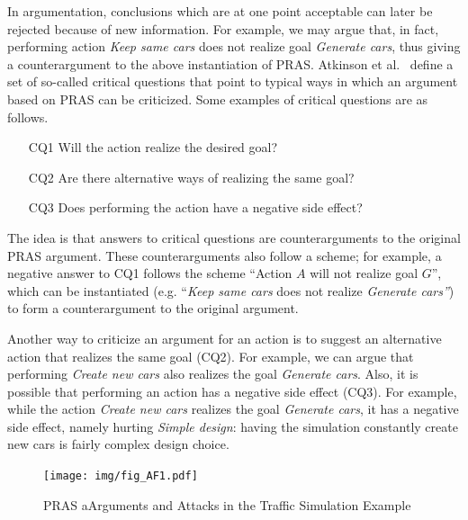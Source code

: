 In argumentation, conclusions which are at one point acceptable can later be rejected because of new information. For example, we may argue that, in fact, performing action \emph{Keep same cars} does not realize goal \emph{Generate cars}, thus giving a counterargument to the above instantiation of PRAS. Atkinson et al.~\cite{atkinson2007} define a set of so-called critical questions that point to typical ways in which an argument based on PRAS can be criticized. Some examples of critical questions are as follows.

\begin{enumerate}
\item[CQ1] Will the action realize the desired goal?
\item[CQ2] Are there alternative ways of realizing the same goal?
\item[CQ3] Does performing the action have a negative side effect?
\end{enumerate}

The idea is that answers to critical questions are counterarguments to the original PRAS argument. These counterarguments also follow a scheme; for example, a negative answer to CQ1 follows the scheme ``Action $A$ will not realize goal $G$'', which can be instantiated (e.g. ``\emph{Keep same cars} does not realize \emph{Generate cars''}) to form a counterargument to the original argument. 

Another way to criticize an argument for an action is to suggest an alternative action that realizes the same goal (CQ2). For example, we can argue that performing \emph{Create new cars} also realizes the goal \emph{Generate cars}. Also, it is possible that performing an action has a negative side effect (CQ3). For example, while the action \emph{Create new cars} realizes the goal \emph{Generate cars}, it has a negative side effect, namely hurting \emph{Simple design}: having the simulation constantly create new cars is fairly complex design choice. 

\begin{figure}[t]
\centering
\texttt{[image: img/fig\_AF1.pdf]}
\caption{PRAS aArguments and Attacks in the Traffic Simulation Example}
\label{fig:pras:example}
\end{figure}


